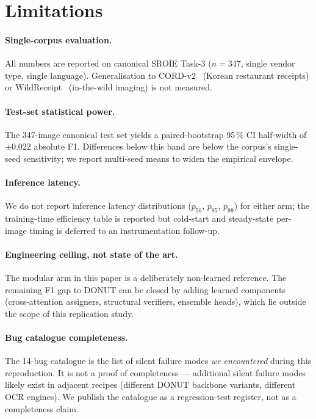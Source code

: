 \section{Limitations}
\label{sec:limitations}

\paragraph{Single-corpus evaluation.}  All numbers are reported on
canonical SROIE Task-3 ($n=347$, single vendor type, single language).
Generalisation to CORD-v2~\cite{park2019cord} (Korean restaurant
receipts) or WildReceipt~\cite{sun2021wildreceipt} (in-the-wild
imaging) is not measured.

\paragraph{Test-set statistical power.}  The 347-image canonical test
set yields a paired-bootstrap 95\,\% CI half-width of $\pm 0.022$
absolute F1.  Differences below this band are below the corpus's
single-seed sensitivity; we report multi-seed means to widen the
empirical envelope.

\paragraph{Inference latency.}  We do not report inference latency
distributions ($p_{50}$, $p_{95}$, $p_{99}$) for either arm; the
training-time efficiency table is reported but cold-start and
steady-state per-image timing is deferred to an instrumentation
follow-up.

\paragraph{Engineering ceiling, not state of the art.}  The modular
arm in this paper is a deliberately non-learned reference.  The
remaining F1 gap to DONUT can be closed by adding learned components
(cross-attention assigners, structural verifiers, ensemble heads),
which lie outside the scope of this replication study.

\paragraph{Bug catalogue completeness.}  The 14-bug catalogue is the
list of silent failure modes \emph{we encountered} during this
reproduction.  It is not a proof of completeness — additional silent
failure modes likely exist in adjacent recipes (different DONUT
backbone variants, different OCR engines).  We publish the catalogue
as a regression-test register, not as a completeness claim.
